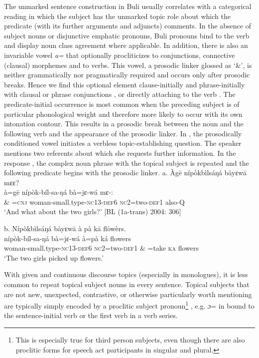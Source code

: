 \documentclass[output=paper]{langsci/langscibook}
\begin{document}
The unmarked sentence construction in Buli usually correlates with a categorical reading in which the subject has the unmarked topic role about which the predicate (with its further arguments and adjuncts) comments. In the absence of subject nouns or disjunctive emphatic pronouns, Buli pronouns bind to the verb and display noun class agreement where applicable. In addition, there is also an invariable vowel \textit{a=} that optionally procliticizes to conjunctions, connective (clausal) morphemes and to verbs. This vowel, a prosodic linker glossed as ‘\&’, is neither grammatically nor pragmatically required and occurs only after prosodic breaks. Hence we find this optional element clause-initially  and phrase-initially  with clausal or phrase conjunctions , or directly attaching to the verb . The predicate-initial occurrence is most common when the preceding subject is of particular phonological weight and therefore more likely to occur with its own intonation contour. This results in a prosodic break between the noun and the following verb and the appearance of the prosodic linker. In , the prosodically conditioned vowel initiates a verbless topic-establishing question. The speaker mentions two referents about which she requests further information. In the response , the complex noun phrase with the topical subject is repeated and the following predicate begins with the prosodic linker.  
\ea
\glll \textup{  a.}  Àg\={e}  nípòkbìlsáŋá        bàyɛw\={a}    mɛɛ?\\
     \textup{à=g\={e}  nípòk-bíl-sa-ŋá      bà=jɛ-wá    mɛ-:}\\
     \& =\textsc{cnj}  woman-small.type-\textsc{nc}13-\textsc{def}6  \textsc{nc}2=two-\textsc{def}1  also-\textsc{Q}\\
\glt   ‘And what about the two girls?’ [BL (1a-trans) 2004: 306]
\z

\ea
\glll   \textup{b.}  Nípòkbìlsáŋá  bàyɛw\={a}  à  pà  k\={a}  flòwèrs.\\
     nípòk-bíl-sa-ŋá  bà=jɛ-wá  à=pà  ká  flowers\\
     woman-small.type-\textsc{nc}13-\textsc{def}6  \textsc{nc}2=two-\textsc{def}1  \& =take  \textsc{ka}  flowers\\
    ‘The two girls picked up flowers.’ \citep[271]{Schwarz2009}
\z

With given and continuous discourse topics (especially in monologues), it is less common to repeat topical subject nouns in every sentence. Topical subjects that are not new, unexpected, contrastive, or otherwise particularly worth mentioning are typically simply encoded by a proclitic subject pronoun\footnote{This is especially true for third person subjects, even though there are also proclitic forms for speech act participants in singular and plural.} , e.g. \textit{ɔ}= in  bound to the sentence-initial verb or the first verb in a verb series. 
\end{document}
